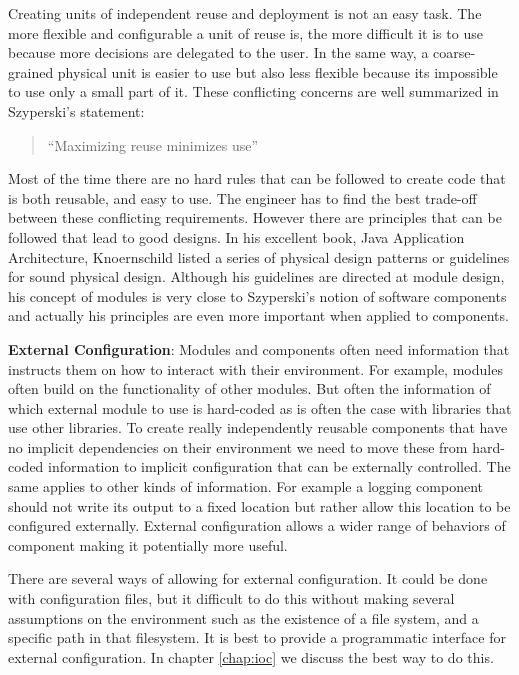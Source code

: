 Creating units of independent reuse and deployment is not an easy task. The more flexible and
configurable a unit of reuse is, the more difficult it is to use because more decisions are
delegated to the user. In the same way, a coarse-grained physical unit is easier to use
but also less flexible because its impossible to  use only a small part of it. These 
conflicting concerns are well summarized in Szyperski's statement:

\begin{quotation}
``Maximizing reuse minimizes use'' 
\end{quotation}

Most of the time there are no hard rules that can be followed to create code that is both reusable,
and easy to use. The engineer has to find the best trade-off between these conflicting requirements.
However there are principles that can be followed that lead to good designs.
In his excellent book, Java Application Architecture, Knoernschild listed a series of physical
design patterns or guidelines for sound physical design. Although his guidelines are directed
at module design, his concept of modules is very close to Szyperski's notion of software components
and actually his principles are even more important when applied to components.

\textbf{External Configuration}:
Modules and components often need information that instructs them
on how to interact with their environment. For example, modules often build on the functionality
of other modules. But often the information of which external module to use is hard-coded as
is often the case with libraries that use other libraries. To create really independently reusable
components that have no implicit dependencies on their environment we need to move these
from hard-coded information to implicit configuration that can be externally controlled.
The same applies to other kinds of information. For example a logging component should not
write its output to a fixed location but rather allow this location to be configured externally.
External configuration allows a wider range of behaviors of component making it potentially
more useful.

There are several ways of allowing for external configuration. It could be done with configuration
files, but it difficult to do this without making several assumptions on the environment such as
the existence of a file system, and a specific path in that filesystem. It is best to provide a
programmatic interface for external configuration. In chapter \ref{chap:ioc} we discuss the best
way to do this.

